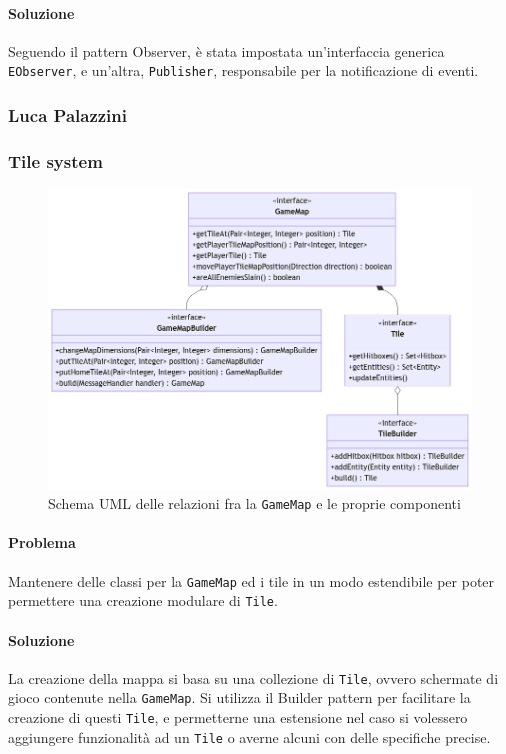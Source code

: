 \documentclass[a4paper,12pt]{report}
\begin{document}
\paragraph{Soluzione} Seguendo il pattern Observer, è stata impostata un’interfaccia generica \texttt{EObserver}, e un’altra, \texttt{Publisher}, responsabile per la notificazione di eventi.
\subsubsection{Luca Palazzini}
\subsubsection{Tile system}
\begin{figure}[H]
\centering{}
\includegraphics[width=1.0\columnwidth]{images/uml-map.png}
\caption{Schema UML delle relazioni fra la \texttt{GameMap} e le proprie componenti}
\label{img:uml-game-map}
\end{figure}
\paragraph{Problema} Mantenere delle classi per la \texttt{GameMap} ed i tile in un modo estendibile per poter permettere una creazione modulare di \texttt{Tile}.
\paragraph{Soluzione} La creazione della mappa si basa su una collezione di \texttt{Tile}, ovvero schermate di gioco contenute nella \texttt{GameMap}. 
%
Si utilizza il Builder pattern per facilitare la creazione di questi \texttt{Tile}, e permetterne una estensione nel caso si volessero aggiungere funzionalità ad un \texttt{Tile} o averne alcuni con delle specifiche precise.
\end{document}
